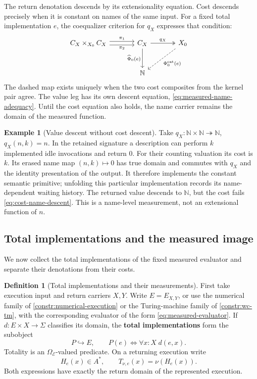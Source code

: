 \documentclass[11pt,a4paper]{article}
\numberwithin{algorithm}{section}
\numberwithin{equation}{section}
\theoremstyle{definition}
\newtheorem{definition}[definition]{Definition}
\newtheorem{example}[example]{Example}
\theoremstyle{remark}
\theoremstyle{plain}
\newcommand{\E}{\mathcal E}
\newcommand{\Truth}{\Omega_{\E}}
\newcommand{\N}{\mathbb N}
\newcommand{\incl}{\hookrightarrow}
\newcommand{\onto}{\twoheadrightarrow}
\theoremstyle{definition}
\theoremstyle{plain}
\begin{document}
The return denotation descends by its extensionality equation.
Cost descends precisely when it is constant on names of the same
input. For a fixed total implementation $e$, the coequalizer
criterion for $q_X$ expresses that condition:
\begin{equation}\label{eq:cat-cost-descent}
\begin{tikzcd}[column sep=large,row sep=large]
 C_X\times_{X_0}C_X
   \arrow[r,shift left=.6ex,"{\pi_1}"]
   \arrow[r,shift right=.6ex,"{\pi_2}"']
   & C_X \arrow[r,two heads,"{q_X}"]
       \arrow[d,"{\widehat\Phi_0(e)}"']
   & X_0 \arrow[dl,dashed,"{\Phi_0^{\mathrm{ext}}(e)}"]\\
 & \N &
\end{tikzcd}
\end{equation}
The dashed map exists uniquely when the two cost composites from the
kernel pair agree. The value leg has its own descent equation,
\cref{eq:measured-name-adequacy}. Until the cost equation also holds,
the name carrier remains the domain of the measured function.


\begin{example}[Value descent without cost descent]
Take $q_X:\N\times\N\onto\N$, $q_X(n,k)=n$. In the retained
signature a description can perform $k$ implemented idle invocations
and return $0$. For their counting valuation its cost is $k$.
Its erased name map $(n,k)\mapsto0$ has true domain and commutes
with $q_X$ and the identity presentation of the output. It therefore
implements the constant semantic primitive; unfolding this particular
implementation records its name-dependent waiting history.
The returned value descends to $\N$, but the cost fails
\eqref{eq:cost-name-descent}. This is a name-level measurement, not
an extensional function of $n$.
\end{example}

\subsection{Total implementations and the measured image}
We now collect the total implementations of the fixed measured
evaluator and separate their denotations from their costs.


\begin{definition}[Total implementations and their measurements]\label{def:total-implementations}
First take execution input and return carriers $X,Y$.
Write $E=E_{X,Y}$, or use the numerical family of
\cref{constr:numerical-execution} or the Turing-machine family of
\cref{constr:wc-tm}, with the corresponding evaluator
of the form
\eqref{eq:measured-evaluator}. If $d:E\times X\to\Sigma$ classifies
its domain, the \textbf{total implementations} form the subobject
\[
 P\incl E,\qquad P(e)\iff\forall x:X\;d(e,x).
\]
Totality is an $\Truth$-valued predicate. On a returning execution write
\begin{equation}\label{eq:history-measurement}
 H_e(x)\in A^*,\qquad T_{\nu,e}(x)=\nu(H_e(x)).
\end{equation}
Both expressions have exactly the return domain of the represented
execution.
\end{definition}
\end{document}
